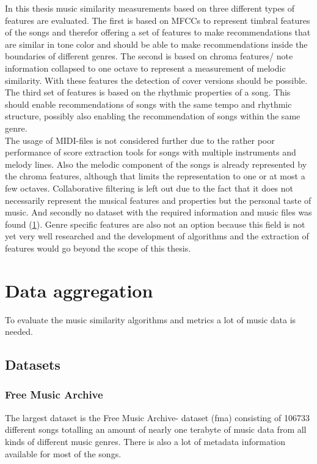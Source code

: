 In this thesis music similarity measurements based on three different types of features are evaluated. 
The first is based on MFCCs to represent timbral features of the songs and therefor offering a set of features to make recommendations that are similar in tone color and should be able to make recommendations inside the boundaries of different genres.
The second is based on chroma features/ note information collapsed to one octave to represent a measurement of melodic similarity. With these features the detection of cover versions should be possible.  
The third set of features is based on the rhythmic properties of a song. This should enable recommendations of songs with the same tempo and rhythmic structure, possibly also enabling the recommendation of songs within the same genre.
\ \\
The usage of MIDI-files is not considered further due to the rather poor performance of score extraction tools for songs with multiple instruments and melody lines. Also the melodic component of the songs is already represented by the chroma features, although that limits the representation to one or at most a few octaves. 
Collaborative filtering is left out due to the fact that it does not necessarily represent the musical features and properties but the personal taste of music. And secondly no dataset with the required information and music files was found (\ref{data}). 
Genre specific features are also not an option because this field is not yet very well researched and the development of algorithms and the extraction of features would go beyond the scope of this thesis.

\chapter{Data aggregation}\label{data}

To evaluate the music similarity algorithms and metrics a lot of music data is needed.

\section{Datasets}\label{datasets}

\subsection{Free Music Archive}

The largest dataset is the Free Music Archive- dataset (fma) consisting of 106733 different songs totalling an amount of nearly one terabyte of music data from all kinds of different music genres.\cite{fma1} There is also a lot of metadata information available for most of the songs.

